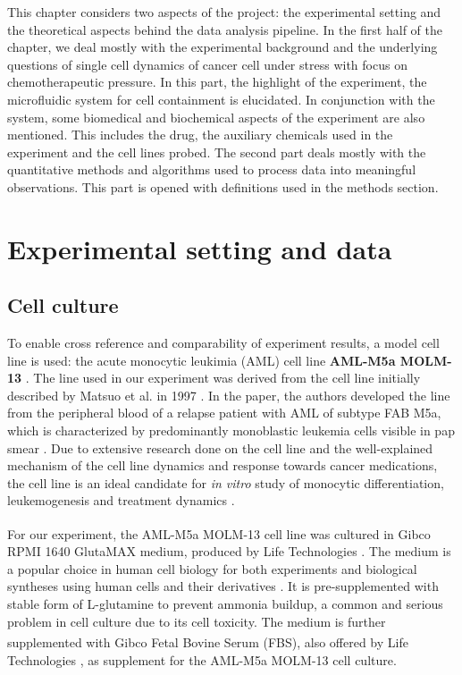 \documentclass[pdftex,12pt,a4paper]{report}
\begin{document}
This chapter considers two aspects of the project: the experimental setting and the theoretical aspects behind the data analysis pipeline. In the first half of the chapter, we deal mostly with the experimental background and the underlying questions of single cell dynamics of cancer cell under stress with focus on chemotherapeutic pressure. In this part, the highlight of the experiment, the microfluidic system for cell containment is elucidated. In conjunction with the system, some biomedical and biochemical aspects of the experiment are also mentioned. This includes the drug, the auxiliary chemicals used in the experiment and the cell lines probed. The second part deals mostly with the quantitative methods and algorithms used to process data into meaningful observations. This part is opened with definitions used in the methods section.

\section{Experimental setting and data}

\subsection{Cell culture}
\label{subsection:cell_culture}

To enable cross reference and comparability of experiment results, a model cell line is used: the acute monocytic leukimia (AML) cell line \textbf{AML-M5a MOLM-13} \cite{matsuo1997two}. The line used in our experiment was derived from the cell line initially described by Matsuo et al. in 1997 \cite{matsuo1997two}. In the paper, the authors developed the line from the peripheral blood of a relapse patient with AML of subtype FAB M5a, which is characterized by predominantly monoblastic leukemia cells visible in pap smear \cite{arber20162016}. Due to extensive research done on the cell line and the well-explained mechanism of the cell line dynamics and response towards cancer medications, the cell line is an ideal candidate for \textit{in vitro} study of monocytic differentiation, leukemogenesis and treatment dynamics \cite{matsuo1997two, kelly2002ct53518, yokota1997internal}.

For our experiment, the AML-M5a MOLM-13 cell line was cultured in Gibco\textsuperscript{\textregistered} RPMI 1640 GlutaMAX medium, produced by Life Technologies \cite{gibcocellculture2017}. The medium is a popular choice in human cell biology for both experiments and biological syntheses using human cells and their derivatives \cite{blight2000efficient, shimizu2002fabrication}. It is pre-supplemented with stable form of L-glutamine to prevent ammonia buildup, a common and serious problem in cell culture due to its cell toxicity\cite{satter1974effect}. The medium is further supplemented with Gibco\textsuperscript{\textregistered} Fetal Bovine Serum (FBS), also offered by Life Technologies \cite{gibcofbs2017}, as supplement for the AML-M5a MOLM-13 cell culture.
\end{document}
